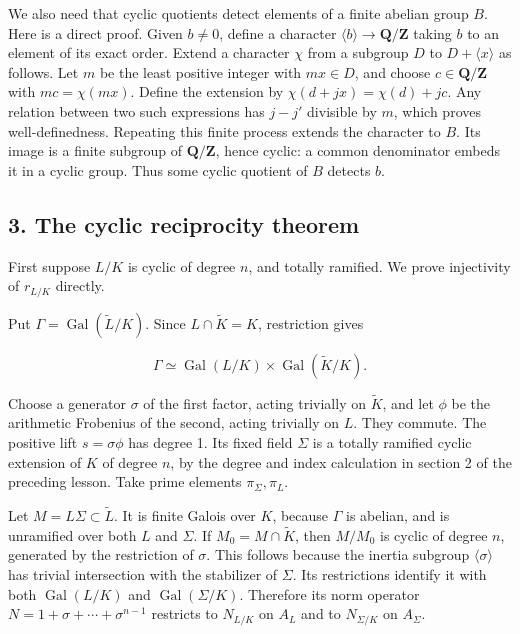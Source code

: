 \documentclass[11pt,a4paper]{article}
\begin{document}
We also need that cyclic quotients detect elements of a finite abelian
group \(B\). Here is a direct proof. Given \(b\ne0\), define a character
\(\langle b\rangle\to\mathbf Q/\mathbf Z\) taking \(b\) to an element of
its exact order. Extend a character \(\chi\) from a subgroup \(D\) to
\(D+\langle x\rangle\) as follows. Let \(m\) be the least positive
integer with \(mx\in D\), and choose \(c\in\mathbf Q/\mathbf Z\) with
\(mc=\chi(mx)\). Define the extension by \(\chi(d+jx)=\chi(d)+jc\). Any
relation between two such expressions has \(j-j'\) divisible by \(m\),
which proves well-definedness. Repeating this finite process extends the
character to \(B\). Its image is a finite subgroup of
\(\mathbf Q/\mathbf Z\), hence cyclic: a common denominator embeds it in
a cyclic group. Thus some cyclic quotient of \(B\) detects \(b\).

\subsection{3. The cyclic reciprocity
theorem}\label{the-cyclic-reciprocity-theorem}

First suppose \(L/K\) is cyclic of degree \(n\), and totally ramified.
We prove injectivity of \(r_{L/K}\) directly.

Put \(\Gamma=\operatorname{Gal}(\widetilde L/K)\). Since
\(L\cap\widetilde K=K\), restriction gives

\[
\Gamma\simeq\operatorname{Gal}(L/K)\times
\operatorname{Gal}(\widetilde K/K).
\]

Choose a generator \(\sigma\) of the first factor, acting trivially on
\(\widetilde K\), and let \(\phi\) be the arithmetic Frobenius of the
second, acting trivially on \(L\). They commute. The positive lift
\(s=\sigma\phi\) has degree 1. Its fixed field \(\Sigma\) is a totally
ramified cyclic extension of \(K\) of degree \(n\), by the degree and
index calculation in section 2 of the preceding lesson. Take prime
elements \(\pi_\Sigma,\pi_L\).

Let \(M=L\Sigma\subset\widetilde L\). It is finite Galois over \(K\),
because \(\Gamma\) is abelian, and is unramified over both \(L\) and
\(\Sigma\). If \(M_0=M\cap\widetilde K\), then \(M/M_0\) is cyclic of
degree \(n\), generated by the restriction of \(\sigma\). This follows
because the inertia subgroup \(\langle\sigma\rangle\) has trivial
intersection with the stabilizer of \(\Sigma\). Its restrictions
identify it with both \(\operatorname{Gal}(L/K)\) and
\(\operatorname{Gal}(\Sigma/K)\). Therefore its norm operator
\(N=1+\sigma+\cdots+\sigma^{n-1}\) restricts to \(N_{L/K}\) on \(A_L\)
and to \(N_{\Sigma/K}\) on \(A_\Sigma\).
\end{document}
